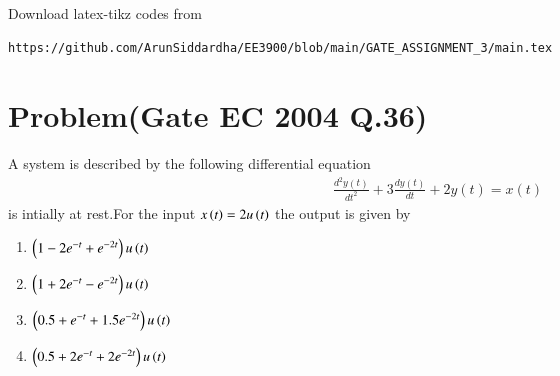 \documentclass[journal,12pt,twocolumn]{IEEEtran}
\begin{document}
%
Download latex-tikz codes from 
%
\begin{lstlisting}
https://github.com/ArunSiddardha/EE3900/blob/main/GATE_ASSIGNMENT_3/main.tex
\end{lstlisting}
\section{Problem(Gate EC 2004 Q.36)}
A system is described by the following differential equation
\begin{align}
    \frac{d^2y(t)}{dt^2}+3\frac{dy(t)}{dt}+2y(t) =x(t) \label{q}
\end{align}
is intially at rest.For the input $x\left(t\right)=2u\left(t\right)$ the output is given by
\begin{enumerate}
    \item $\left(1-2e^{-t}+e^{-2t}\right)u\left(t\right)$
    \item $\left(1+2e^{-t}-e^{-2t}\right)u\left(t\right)$
    \item $\left(0.5+e^{-t}+1.5e^{-2t}\right)u\left(t\right)$
    \item $\left(0.5+2e^{-t}+2e^{-2t}\right)u\left(t\right)$
\end{enumerate}
\end{document}
